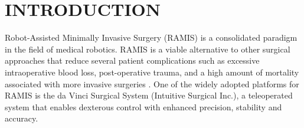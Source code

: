 \documentclass[letterpaper, 10 pt, conference]{ieeeconf}
\begin{document}
\begin{abstract}

\end{abstract}

\section{INTRODUCTION\label{sec:intro}}
Robot-Assisted Minimally Invasive Surgery (RAMIS) is a consolidated paradigm in the field of medical robotics. RAMIS is a viable alternative to other surgical approaches that reduce several patient complications such as excessive intraoperative blood loss, post-operative trauma, and a high amount of mortality associated with more invasive surgeries \cite{simaan2018medical}. One of the widely adopted platforms for RAMIS is the da Vinci Surgical System (Intuitive Surgical Inc.), a teleoperated system that enables dexterous control with enhanced precision, stability and accuracy.
\end{document}
